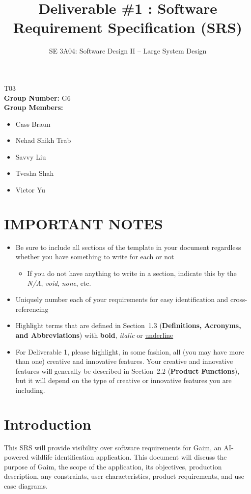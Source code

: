 \documentclass[]{article}
\title{Deliverable \#1 : Software Requirement Specification (SRS)}
\author{SE 3A04: Software Design II -- Large System Design}
\date{}
\begin{document}
\maketitle	
{} T03\\
{\bf Group Number:} G6 \\
{\bf Group Members:} 
\begin{itemize}
	\item Cass Braun
	\item Nehad Shikh Trab
	\item Savvy Liu
	\item Tvesha Shah
	\item Victor Yu
\end{itemize}

\section*{IMPORTANT NOTES}
\begin{itemize}
	\item Be sure to include all sections of the template in your document regardless whether you have something to write for each or not
	\begin{itemize}
		\item If you do not have anything to write in a section, indicate this by the \emph{N/A}, \emph{void}, \emph{none}, etc.
	\end{itemize}
	\item Uniquely number each of your requirements for easy identification and cross-referencing
	\item Highlight terms that are defined in Section~1.3 (\textbf{Definitions, Acronyms, and Abbreviations}) with \textbf{bold}, \emph{italic} or \underline{underline}
	\item For Deliverable 1, please highlight, in some fashion, all (you may have more than one) creative and innovative features. Your creative and innovative features will generally be described in Section~2.2 (\textbf{Product Functions}), but it will depend on the type of creative or innovative features you are including.
\end{itemize}

\newpage
\section{Introduction}
\label{sec:introduction}

This SRS will provide visibility over software requirements for Gaim, an AI-powered wildlife identification application. This document will discuss the purpose of Gaim, the scope of the application, its objectives, production description, any constraints, user characteristics, product requirements, and use case diagrams.
\end{document}
